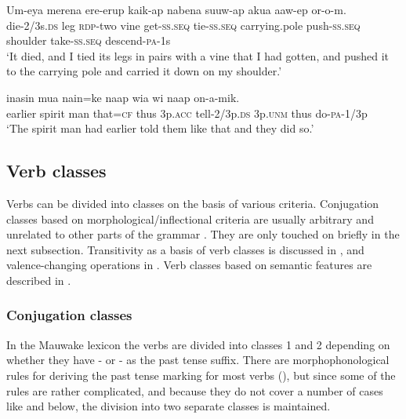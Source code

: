 \ea%
\label{ex:3:x1032}
\gll Um-eya merena ere-erup {\ob}  kaik-ap nabena suuw-ap akua aaw-ep or-o-m.\\
die-2/3s.\textsc{ds} leg \textsc{rdp}-two vine get-\textsc{ss}.\textsc{seq} tie-\textsc{ss}.\textsc{seq} carrying.pole push-\textsc{ss}.\textsc{seq} shoulder take-\textsc{ss}.\textsc{seq} descend-\textsc{pa}-1s\\
\glt `It died, and I tied its legs in pairs with a vine that I had gotten, and pushed it to the carrying pole and carried it down on my shoulder.'
\z

\ea%
\label{ex:3:x1033}
\gll {} inasin mua nain=ke naap wia  wi naap on-a-mik.\\
earlier spirit man that=\textsc{cf} thus 3p.\textsc{acc} tell-2/3p.\textsc{ds} 3p.\textsc{unm} thus do-\textsc{pa}-1/3p\\
\glt `The spirit man had earlier told them like that and they did so.'
\z

\subsection{Verb classes} \label{sec:3.8.4}
{}
Verbs can be divided into classes on the basis of various criteria. Conjugation classes based on morphological/inflectional criteria are usually arbitrary and unrelated to other parts of the grammar \citep[191]{Anderson1985b}. They are only touched on briefly in the next subsection. Transitivity as a basis of verb classes is discussed in , and valence-changing operations in . Verb classes based on semantic features are described in .

\subsubsection{Conjugation classes}\label{sec:3.8.4.1}
{}
In the Mauwake lexicon the verbs are divided into classes 1 and 2 depending on whether they have \nobreakdash- or \nobreakdash- as the past tense suffix. There are morphophonological rules for deriving the past tense marking for most verbs (), but since some of the rules are rather complicated, and because they do not cover a number of cases like  and  below, the division into two separate classes is maintained.
%
%

